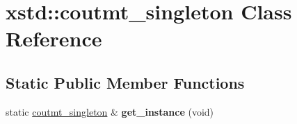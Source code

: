 \hypertarget{classxstd_1_1coutmt__singleton}{\section{xstd\-:\-:coutmt\-\_\-singleton Class Reference}
\label{classxstd_1_1coutmt__singleton}
}
\subsection*{Static Public Member Functions}
\begin{DoxyCompactItemize}
\item 
\hypertarget{classxstd_1_1coutmt__singleton_a0c478170b82e253a79c51160fe7049a2}{static \hyperlink{classxstd_1_1coutmt__singleton}{coutmt\-\_\-singleton} \& {\bfseries get\-\_\-instance} (void)}\label{classxstd_1_1coutmt__singleton_a0c478170b82e253a79c51160fe7049a2}

\end{DoxyCompactItemize}
